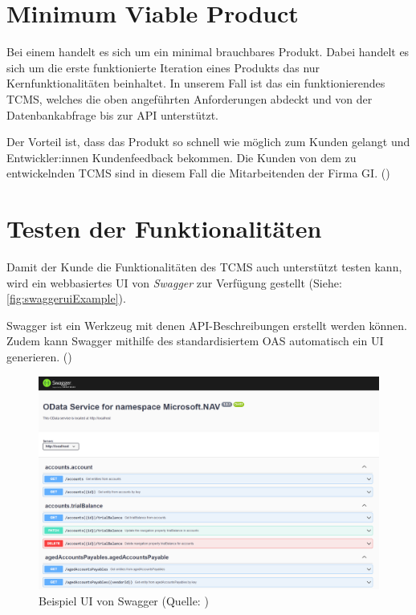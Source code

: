 \documentclass[a4paper, fontsize=11pt, parskip=half, twoside]{scrreprt}
\begin{document}
	
	\section{Minimum Viable Product}
	Bei einem  handelt es sich um ein minimal brauchbares Produkt. 
	Dabei handelt es sich um die erste funktionierte Iteration eines Produkts das nur Kernfunktionalitäten beinhaltet.
	In unserem Fall ist das ein funktionierendes \ac{TCMS}, welches die oben angeführten Anforderungen abdeckt und von der Datenbankabfrage bis zur \ac{API} unterstützt.
	
	Der Vorteil ist, dass das Produkt so schnell wie möglich zum Kunden gelangt und Entwickler:innen Kundenfeedback bekommen.
	Die Kunden von dem zu entwickelnden \ac{TCMS} sind in diesem Fall die Mitarbeitenden der Firma \acl{GI}. (\textcite{alliance_what_2017})
	
	
	\section{Testen der Funktionalitäten}
	Damit der Kunde die Funktionalitäten des \ac{TCMS} auch  unterstützt testen kann, wird ein webbasiertes \ac{UI} von \emph{Swagger} zur Verfügung gestellt (Siehe: \autoref{fig:swaggeruiExample}).
	
	Swagger ist ein Werkzeug mit denen \ac{API}-Beschreibungen erstellt werden können.
	Zudem kann Swagger mithilfe des standardisiertem \ac{OAS} automatisch ein \ac{UI} generieren. (\textcite{noauthor_api_nodate})
	\newline
	
	\begin{figure}[ht]
		\centering
		\includegraphics[scale=0.6]{assets/swaggerui.png}
		\caption{Beispiel \ac{UI} von Swagger (Quelle: \textcite{noauthor_host_nodate})}
		\label{fig:swaggeruiExample}
	\end{figure}
\end{document}
